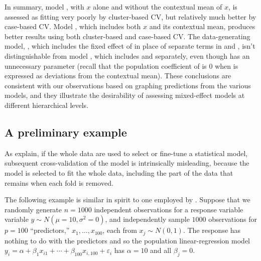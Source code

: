 \documentclass[
]{jss}
\begin{document}
In summary, model , with \(x\) alone and without the
contextual mean of \(x\), is assessed as fitting very poorly by
cluster-based CV, but relatively much better by case-based CV. Model
, which includes both \(x\) and its contextual mean,
produces better results using both cluster-based and case-based CV. The
data-generating model, , which includes the fixed effect of
 in place of separate terms in  and ,
isn't distinguishable from model , which includes 
and  separately, even though  has an unnecessary
parameter (recall that the population coefficient of  is 0 when
 is expressed as deviations from the contextual mean). These
conclusions are consistent with our observations based on graphing
predictions from the various models, and they illustrate the
desirability of assessing mixed-effect models at different hierarchical
levels.

\hypertarget{a-preliminary-example}{%
\subsection{A preliminary example}\label{a-preliminary-example}}

As \citet[Sec. 7.10.2: ``The Wrong and Right Way to Do
Cross-validation'']{HastieTibshiraniFriedman:2009} explain, if the whole
data are used to select or fine-tune a statistical model, subsequent
cross-validation of the model is intrinsically misleading, because the
model is selected to fit the whole data, including the part of the data
that remains when each fold is removed.

The following example is similar in spirit to one employed by
\citet{HastieTibshiraniFriedman:2009}. Suppose that we randomly generate
\(n = 1000\) independent observations for a response variable variable
\(y \sim N(\mu = 10, \sigma^2 = 0)\), and independently sample \(1000\)
observations for \(p = 100\) ``predictors,'' \(x_1, \ldots, x_{100}\),
each from \(x_j \sim N(0, 1)\). The response has nothing to do with the
predictors and so the population linear-regression model
\(y_i = \alpha + \beta_1 x_{i1} + \cdots + \beta_{100} x_{i,100} + \varepsilon_i\)
has \(\alpha = 10\) and all \(\beta_j = 0\).
\end{document}
